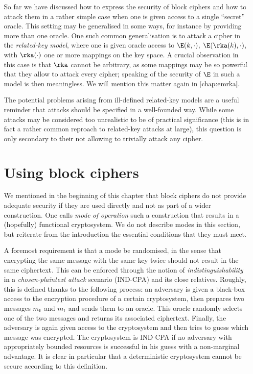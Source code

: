 So far we have discussed how to express the security of block ciphers and how to attack them in a rather simple case when one is given access to a single ``secret'' oracle. This setting may be generalised
in some ways, for instance by providing more than one oracle. One such common generalisation is to attack a cipher in the \emph{related-key model}, where one is given oracle access to
$\E(k,\cdot)$, $\E(\rka(k),\cdot)$, with $\rka(\cdot)$ one or more mappings on the key space. A crucial observation in this case is that $\rka$ cannot be arbitrary, as some mappings may
be so powerful that they allow to attack every cipher; speaking of the security of $\E$ in such a model is then meaningless. We will mention this matter again in \autoref{chap:emrka}.

The potential problems arising from ill-defined related-key models are a useful reminder that attacks should be specified in a well-founded way. While some attacks may be
considered too unrealistic to be of practical significance (this is in fact a rather common reproach to related-key attacks at large), this question is only secondary to their not allowing to trivially
attack any cipher.

\section{Using block ciphers}
\label{sec:bc_modes}

We mentioned in the beginning of this chapter that block ciphers do not provide adequate security if they are used directly and not as part of a wider construction. One calls \emph{mode
of operation} such a construction that results in a (hopefully) functional cryptosystem. We do not describe modes in this section, but reiterate from the introduction the essential conditions that they
must meet.

A foremost requirement is that a mode be randomised, in the sense that encrypting the same message with the same key twice should not result in the same ciphertext. This can be
enforced through the notion of \emph{indistinguishability} in a \emph{chosen-plaintext attack} scenario (\textsf{IND-CPA}) and its close relatives. Roughly, this is
defined thanks to the following process: an adversary is given a black-box access to the encryption procedure of a certain cryptosystem, then prepares two messages $m_0$ and $m_1$ and sends them to an oracle. This oracle randomly selects one of the two messages and
returns its associated ciphertext. Finally, the adversary is again given access to the cryptosystem and then tries to guess which message was encrypted. The cryptosystem is \textsf{IND-CPA}
if no adversary with appropriately bounded resources is successful in his guess with a non-marginal advantage. It is clear in particular that a deterministic cryptosystem cannot be secure according
to this definition.

